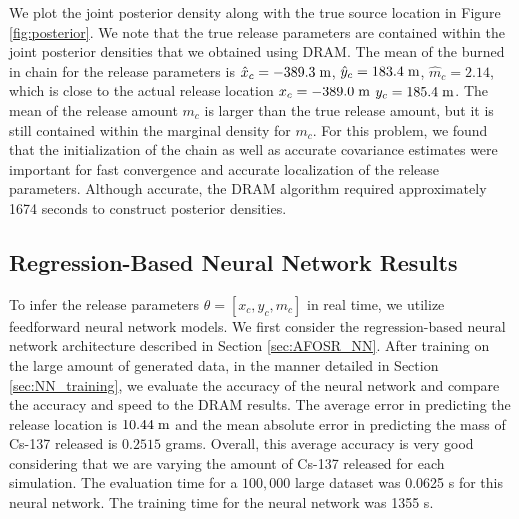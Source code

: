 \documentclass[sn-mathphys-ay]{sn-jnl}
\begin{document}
We plot the joint posterior density along with the true source location in Figure \ref{fig:posterior}. We note that the true release parameters are contained within the joint posterior densities that we obtained using DRAM. The mean of the burned in chain for the release parameters is $\hat{x}_c=-389.3 \hspace{1mm} \text{m}$, $\hat{y}_c=183.4 \hspace{1mm} \text{m}$, $\hat{m}_c=2.14$, which is close to the actual release location $x_c=-389.0 \hspace{1mm} \text{m}$ $y_c=185.4 \hspace{1mm} \text{m}$. The mean of the release amount $m_c$ is larger than the true release amount, but it is still contained within the marginal density for $m_c$. For this problem, we found that the initialization of the chain as well as accurate covariance estimates were important for fast convergence and accurate localization of the release parameters. Although accurate, the DRAM algorithm required approximately 1674 seconds to construct posterior densities. 

\subsection{Regression-Based Neural Network Results}
To infer the release parameters $\theta=[x_c,y_c,m_c]$ in real time, we utilize feedforward neural network models. We first consider the regression-based neural network architecture described in Section \ref{sec:AFOSR_NN}. After training on the large amount of generated data, in the manner detailed in Section \ref{sec:NN_training}, we evaluate the accuracy of the neural network and compare the accuracy and speed to the DRAM results. The average error in predicting the release location is $10.44 \hspace{1mm} \text{m}$ and the mean absolute error in predicting the mass of Cs-137 released is $0.2515$ grams. Overall, this average accuracy is very good considering that we are varying the amount of Cs-137 released for each simulation. The evaluation time for a $100{,}000$ large dataset was 0.0625 s for this neural network. The training time for the neural network was 1355 s. 
\end{document}
